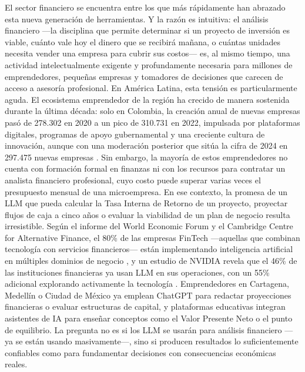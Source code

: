 \documentclass[12pt,a4paper]{article}
\begin{document}
El sector financiero se encuentra entre los que más rápidamente han abrazado esta nueva generación de herramientas. Y la razón es intuitiva: el análisis financiero ---la disciplina que permite determinar si un proyecto de inversión es viable, cuánto vale hoy el dinero que se recibirá mañana, o cuántas unidades necesita vender una empresa para cubrir sus costos--- es, al mismo tiempo, una actividad intelectualmente exigente y profundamente necesaria para millones de emprendedores, pequeñas empresas y tomadores de decisiones que carecen de acceso a asesoría profesional. En América Latina, esta tensión es particularmente aguda. El ecosistema emprendedor de la región ha crecido de manera sostenida durante la última década: solo en Colombia, la creación anual de nuevas empresas pasó de 278.302 en 2020 a un pico de 310.731 en 2022, impulsada por plataformas digitales, programas de apoyo gubernamental y una creciente cultura de innovación, aunque con una moderación posterior que sitúa la cifra de 2024 en 297.475 nuevas empresas \citep{Confecamaras2025}. Sin embargo, la mayoría de estos emprendedores no cuenta con formación formal en finanzas ni con los recursos para contratar un analista financiero profesional, cuyo costo puede superar varias veces el presupuesto mensual de una microempresa. En ese contexto, la promesa de un LLM que pueda calcular la Tasa Interna de Retorno de un proyecto, proyectar flujos de caja a cinco años o evaluar la viabilidad de un plan de negocio resulta irresistible. Según el informe del World Economic Forum y el Cambridge Centre for Alternative Finance, el 80\% de las empresas FinTech ---aquellas que combinan tecnología con servicios financieros--- están implementando inteligencia artificial en múltiples dominios de negocio \citep{WEFCCAF2025}, y un estudio de NVIDIA revela que el 46\% de las instituciones financieras ya usan LLM en sus operaciones, con un 55\% adicional explorando activamente la tecnología \citep{NVIDIA2024}. Emprendedores en Cartagena, Medellín o Ciudad de México ya emplean ChatGPT para redactar proyecciones financieras o evaluar estructuras de capital, y plataformas educativas integran asistentes de IA para enseñar conceptos como el Valor Presente Neto o el punto de equilibrio. La pregunta no es si los LLM se usarán para análisis financiero ---ya se están usando masivamente---, sino si producen resultados lo suficientemente confiables como para fundamentar decisiones con consecuencias económicas reales.
\end{document}
